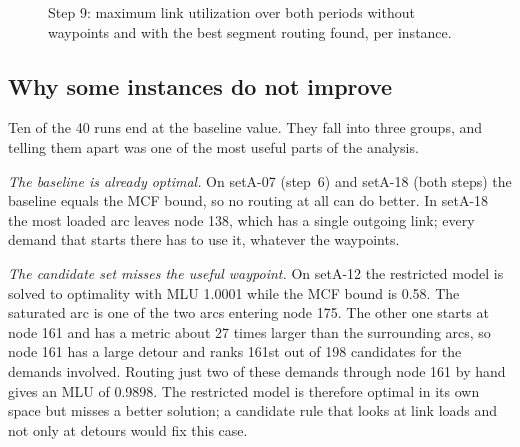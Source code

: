 \documentclass[11pt,a4paper]{article}
\begin{document}
\begin{figure}[tbp]
\centering

\caption{Step 9: maximum link utilization over both periods without waypoints and with the best
segment routing found, per instance.}\label{fig:bars}
\end{figure}

\subsection{Why some instances do not improve}

Ten of the 40 runs end at the baseline value. They fall into three groups, and telling them apart
was one of the most useful parts of the analysis.

\emph{The baseline is already optimal.} On setA-07 (step~6) and setA-18 (both steps) the baseline
equals the MCF bound, so no routing at all can do better. In setA-18 the most loaded arc leaves
node 138, which has a single outgoing link; every demand that starts there has to use it, whatever
the waypoints.

\emph{The candidate set misses the useful waypoint.} On setA-12 the restricted model is solved to
optimality with MLU 1.0001 while the MCF bound is 0.58. The saturated arc is one of the two arcs
entering node 175. The other one starts at node 161 and has a metric about 27 times larger than the
surrounding arcs, so node 161 has a large detour and ranks 161st out of 198 candidates for the
demands involved. Routing just two of these demands through node 161 by hand gives an MLU of
0.9898. The restricted model is therefore optimal in its own space but misses a better solution; a
candidate rule that looks at link loads and not only at detours would fix this case.
\end{document}
